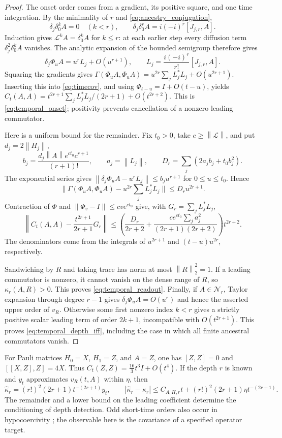 \documentclass[11pt,a4paper]{amsart}
\numberwithin{equation}{section}
\theoremstyle{definition}
\theoremstyle{remark}
\newcommand{\norm}[1]{\left\lVert#1\right\rVert}
\begin{document}
\begin{proof}
The onset order comes from a gradient, its positive square, and one time integration. By the minimality of $r$ and \eqref{eq:ancestry_conjugation},
\[
 \delta_j\delta_0^kA=0\quad(k<r),\qquad
 \delta_j\delta_0^rA=i(-i)^r[J_{j,r},A].
\]
Induction gives $\mathcal L^kA=\delta_0^kA$ for $k\le r$: at each earlier step every diffusion term $\delta_j^2\delta_0^kA$ vanishes. The analytic expansion of the bounded semigroup therefore gives
\[
 \delta_j\Phi_uA=u^rL_j+O(u^{r+1}),\qquad
 L_j=\frac{i(-i)^r}{r!}[J_{j,r},A].
\]
Squaring the gradients gives $\Gamma(\Phi_uA,\Phi_uA)=u^{2r}\sum_jL_j^*L_j+O(u^{2r+1})$. Inserting this into \eqref{eq:timecov}, and using $\Phi_{t-u}=I+O(t-u)$, yields
$C_t(A,A)=t^{2r+1}\sum_jL_j^*L_j/(2r+1)+O(t^{2r+2})$.
This is \eqref{eq:temporal_onset}; positivity prevents cancellation of a nonzero leading commutator.

Here is a uniform bound for the remainder. Fix $t_0>0$, take $c\ge\norm{\mathcal L}$, and put $d_j=2\norm{H_j}$,
\[
 b_j=\frac{d_j\norm A e^{ct_0}c^{r+1}}{(r+1)!},
 \qquad a_j=\norm{L_j},\qquad
 D_r=\sum_j(2a_jb_j+t_0b_j^2).
\]
The exponential series gives $\norm{\delta_j\Phi_uA-u^rL_j}\le b_ju^{r+1}$ for $0\le u\le t_0$. Hence
\[
 \Big\|\Gamma(\Phi_uA,\Phi_uA)-u^{2r}\sum_jL_j^*L_j\Big\|
 \le D_ru^{2r+1}.
\]
Contraction of $\Phi$ and $\norm{\Phi_v-I}\le cv e^{ct_0}$ give, with $G_r=\sum_jL_j^*L_j$,
\[
 \left\|C_t(A,A)-\frac{t^{2r+1}}{2r+1}G_r\right\|
 \le\left(\frac{D_r}{2r+2}
 +\frac{ce^{ct_0}\sum_ja_j^2}{(2r+1)(2r+2)}\right)t^{2r+2}.
\]
The denominators come from the integrals of $u^{2r+1}$ and $(t-u)u^{2r}$, respectively.

Sandwiching by $R$ and taking trace has norm at most $\norm R_2^2=1$. If a leading commutator is nonzero, it cannot vanish on the dense range of $R$, so $\kappa_r(A,R)>0$. This proves \eqref{eq:temporal_readout}. Finally, if $A\in\mathcal N_r$, Taylor expansion through degree $r-1$ gives $\delta_j\Phi_uA=O(u^r)$ and hence the asserted upper order of $v_R$. Otherwise some first nonzero index $k<r$ gives a strictly positive scalar leading term of order $2k+1$, incompatible with $O(t^{2r+1})$. This proves \eqref{eq:temporal_depth_iff}, including the case in which all finite ancestral commutators vanish.
\end{proof}

For Pauli matrices $H_0=X$, $H_1=Z$, and $A=Z$, one has $[Z,Z]=0$ and $[[X,Z],Z]=4X$. Thus
$C_t(Z,Z)=\frac{16}{3}t^3I+O(t^4)$.
If the depth $r$ is known and $y_t$ approximates $v_R(t,A)$ within $\eta$, then
\begin{equation}\label{eq:onset_estimator}
 \widehat\kappa_r=(r!)^2(2r+1)t^{-(2r+1)}y_t,\qquad
 |\widehat\kappa_r-\kappa_r|
 \le C_{A,H,r}t+(r!)^2(2r+1)\eta t^{-(2r+1)}.
\end{equation}
The remainder and a lower bound on the leading coefficient determine the conditioning of depth detection. Odd short-time orders also occur in hypocoercivity \cite{AAC}; the observable here is the covariance of a specified operator target.
\end{document}
